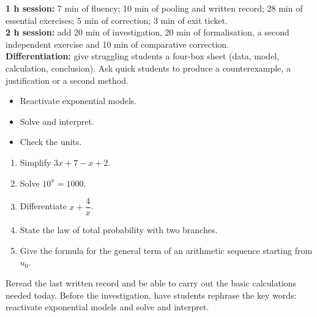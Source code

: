 \ifmxteacher
\begin{method}
\textbf{1 h session:} 7 min of fluency; 10 min of pooling and written record; 28 min of essential exercises; 5 min of correction; 3 min of exit ticket.\\
\textbf{2 h session:} add 20 min of investigation, 20 min of formalisation, a second independent exercise and 10 min of comparative correction.\\
\textbf{Differentiation:} give struggling students a four-box sheet (data, model, calculation, conclusion). Ask quick students to produce a counterexample, a justification or a second method.
\end{method}
\fi
{}
\begin{objectives}\begin{itemize}\item Reactivate exponential models.\item Solve and interpret.\item Check the units.\end{itemize}\end{objectives}
\begin{fluency}\begin{enumerate}\item Simplify $3x+7-x+2$. \item Solve $10^x=1000$. \item Differentiate $x+\dfrac4x$. \item State the law of total probability with two branches. \item Give the formula for the general term of an arithmetic sequence starting from $u_0$. \end{enumerate}\end{fluency}
\begin{prerequisites}Reread the last written record and be able to carry out the basic calculations needed today. Before the investigation, have students rephrase the key words: reactivate exponential models and solve and interpret.\end{prerequisites}

